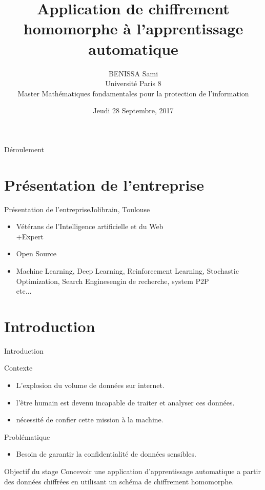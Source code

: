 \documentclass{beamer}
\title{Application de chiffrement homomorphe à l'apprentissage automatique}
\author{BENISSA Sami \\
      Université Paris 8\\
    Master Mathématiques fondamentales pour la protection de l'information}
\institute[Jolibrain, Toulouse, France] %
\date{Jeudi 28 Septembre, 2017}
\begin{document}
\begin{frame}
  \titlepage
\end{frame}
\begin{frame}{Déroulement}
  \tableofcontents
 \end{frame}

\section{Présentation de l'entreprise}


\begin{frame}{Présentation de l'entreprise}{Jolibrain, Toulouse}
\begin{itemize}
  \item {
    Vétérans de l'Intelligence artificielle et du Web\\
    +Expert
    \pause 
  }
  \item {   
    Open Source
    \pause
  }
    \item {   
      Machine Learning, Deep Learning, Reinforcement Learning, Stochastic Optimization, Search Enginesengin de recherche, system P2P \\
      etc...
    \pause
    }
\end{itemize}
\end{frame}
 \section{Introduction}
\begin{frame}{Introduction}
\begin{block}{Contexte}
\begin{itemize}
	\item{L'explosion du volume de données sur internet.}
	\item{l'être humain est devenu incapable de traiter et analyser ces données.}
	\item{nécessité de confier cette mission à la machine.}
\end{itemize}
\end{block}
\begin{block}{Problématique}
\begin{itemize}
	\item{Besoin de garantir la confidentialité de données sensibles.}
	\end{itemize}
\end{block}
\begin{block}{Objectif du stage}
Concevoir une application d'apprentissage automatique a partir des données chiffrées en utilisant un schéma de chiffrement homomorphe.
\end{block}
\end{frame}
\end{document}
